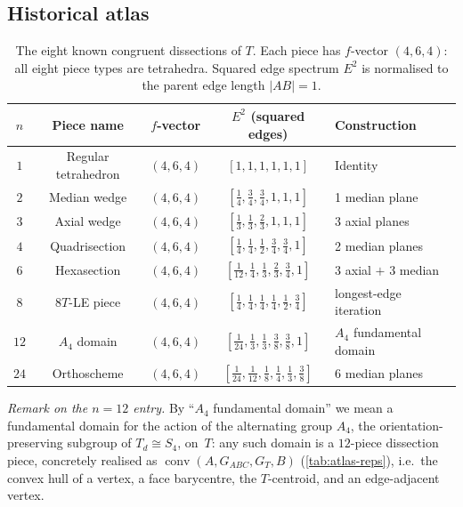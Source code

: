\documentclass[11pt,a4paper]{article}
\theoremstyle{plain}
\theoremstyle{definition}
\theoremstyle{remark}
\DeclareMathOperator{\conv}{conv}
\newcommand{\Td}{T_{\!d}}
\begin{document}
\subsection{Historical atlas}\label{ssec:atlas-table}

\begin{table}[H]
\centering\small
\caption{The eight known congruent dissections of $T$.  Each piece has
$f$-vector $(4,6,4)$: all eight piece types are tetrahedra.  Squared edge
spectrum $E^{2}$ is normalised to the parent edge length $|AB| = 1$.}
\label{tab:atlas}
\begin{tabular}{@{}ccccl@{}}
\toprule
$n$ & Piece name & $f$-vector & $E^{2}$ (squared edges) & Construction \\
\midrule
$1$  & Regular tetrahedron & $(4,6,4)$ & $[1,1,1,1,1,1]$                   & Identity \\
$2$  & Median wedge        & $(4,6,4)$ & $[\tfrac14,\tfrac34,\tfrac34,1,1,1]$ & 1 median plane \\
$3$  & Axial wedge         & $(4,6,4)$ & $[\tfrac13,\tfrac13,\tfrac23,1,1,1]$ & 3 axial planes \\
$4$  & Quadrisection       & $(4,6,4)$ & $[\tfrac14,\tfrac14,\tfrac12,\tfrac34,\tfrac34,1]$ & 2 median planes \\
$6$  & Hexasection         & $(4,6,4)$ & $[\tfrac{1}{12},\tfrac14,\tfrac13,\tfrac23,\tfrac34,1]$ & 3 axial $+$ 3 median \\
$8$  & $8T$-LE piece       & $(4,6,4)$ & $[\tfrac14,\tfrac14,\tfrac14,\tfrac14,\tfrac12,\tfrac34]$ & longest-edge iteration \\
$12$ & $A_{4}$ domain      & $(4,6,4)$ & $[\tfrac{1}{24},\tfrac13,\tfrac13,\tfrac38,\tfrac38,1]$ & $A_{4}$ fundamental domain \\
$24$ & Orthoscheme         & $(4,6,4)$ & $[\tfrac{1}{24},\tfrac{1}{12},\tfrac18,\tfrac14,\tfrac13,\tfrac38]$ & 6 median planes \\
\bottomrule
\end{tabular}
\end{table}

\noindent\emph{Remark on the $n=12$ entry.}  By ``$A_{4}$ fundamental
domain'' we mean a fundamental domain for the action of the alternating
group $A_{4}$, the orientation-preserving subgroup of
$\Td \cong S_{4}$, on~$T$: any such domain is a $12$-piece dissection
piece, concretely realised as $\conv(A,G_{ABC},G_{T},B)$
(\cref{tab:atlas-reps}), i.e.~the convex hull of a vertex, a face
barycentre, the $T$-centroid, and an edge-adjacent vertex.
\end{document}
